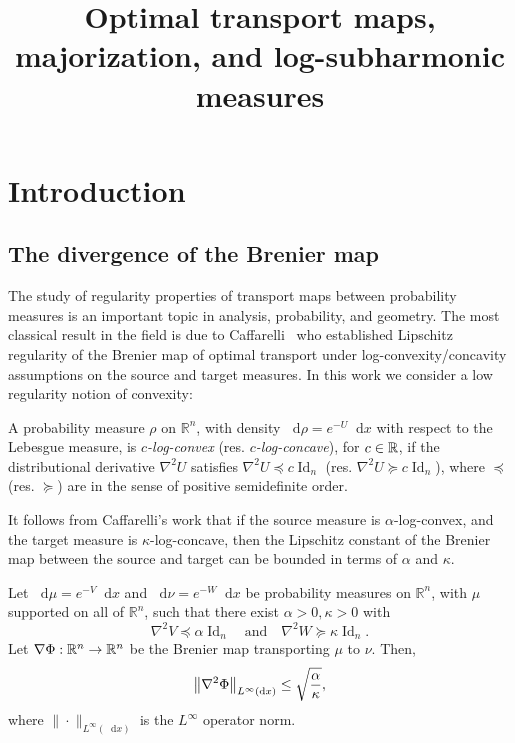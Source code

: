 \documentclass[AHL,Unicode,longabstracts]{cedram}
\title[Optimal transport maps, majorization, and log-subharmonic measures]{Optimal transport maps, majorization, and log-subharmonic measures}
\author[\initial{G.} \lastname{De Philippis}]{\firstname{Guido} \lastname{De Philippis}}
\author[\initial{Y.} \lastname{Shenfeld}]{\firstname{Yair} \lastname{Shenfeld}}
\newcommand{\R}{\mathbb R}
\DeclareMathOperator{\Id}{Id}
\newcommand{\V}{V}
\newcommand{\W}{W}
\newcommand{\dd}{n}
\newcommand{\conv}{c}
\newcommand{\prob}{\rho}
\newcommand{\source}{\mu}
\newcommand{\target}{\nu}
\newcommand{\lsh}{\alpha}
\newcommand{\lc}{\kappa}
\newcommand*\diff{\mathop{}\!\mathrm{d}}
\newcommand{\OT}{\Phi}
\renewcommand*{\to}{\mathchoice{\longrightarrow}{\rightarrow}{\rightarrow}{\rightarrow}}
\let\originalleft\left
\let\originalright\right
\renewcommand{\left}{\mathopen{}\mathclose\bgroup\originalleft}
\renewcommand{\right}{\aftergroup\egroup\originalright}
\let\oldin\in
\renewcommand{\in}{\mathchoice{\oldin}{\oldin}{\,\oldin\,}{\,\oldin\,}}
\begin{document}
\maketitle


\section{Introduction}



\subsection{The divergence of the Brenier map}

The study of regularity properties of transport maps between probability measures is an important topic in analysis, probability, and geometry. The most classical result in the field is due to Caffarelli~\cite{MR1800860} who established Lipschitz regularity of the Brenier map of optimal transport under log-convexity/concavity assumptions on the source and target measures. In this work we consider a low regularity notion of convexity:


\begin{defi}\label{def:log_concave}
A probability measure $\prob$ on $\R^{\dd}$, with density $\diff \prob=e^{-U}\diff x$ with respect to the Lebesgue measure, is \emph{$\conv$-log-convex} (res. \emph{$\conv$-log-concave}), for $\conv\in \R$, if the distributional derivative $\nabla^2U$ satisfies $\nabla^2U \preceq \conv \Id_{\dd}$ (res. $\nabla^2U \succeq \conv \Id_{\dd}$), where $\preceq$ (res. $\succeq$) are in the sense of positive semidefinite order.
\end{defi}

It follows from Caffarelli's work that if the source measure is $\lsh$-log-convex, and the target measure is $\lc$-log-concave, then the Lipschitz constant of the Brenier map between the source and target can be bounded in terms of $\lsh$ and $\lc$.\label{subsec:div_OT_intro}


\begin{theo}\label{thm:Caffarelli_intro}
Let $\diff\source=e^{-\V}\diff x$ and $\diff\target=e^{-\W}\diff x$ be probability measures on $\R^{\dd}$, with $\source$ supported on all of $\R^{\dd}$, such that there exist $\lsh>0,\lc>0$ with
\[
\nabla^2 \V \preceq \lsh \Id_{\dd}\quad\text{and}\quad \nabla^2\W \succeq \lc \Id_{\dd}.
\]
Let $\nabla\OT:\R^{\dd}\to\R^{\dd}$ be the Brenier map transporting $\source$ to $\target$. Then,
\begin{equation}\label{eq:Caffarelli_intro}
\left\|\nabla^2\OT\right\|_{L^{\infty}(\diff x)}\le \sqrt{ \frac{\lsh}{\lc}},
\end{equation}
where $\|\cdot\|_{L^{\infty}(\diff x)}$ is the $L^{\infty}$ operator norm.
\end{theo}
\end{document}
